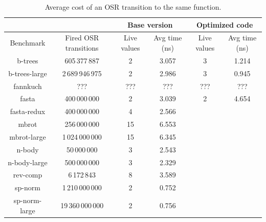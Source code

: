 \begin{table} 
\begin{footnotesize}
    \begin{tabular}{ |c|c|c|c|c|c| }
        \cline{3-6}
        \multicolumn{2}{c|}{} & \multicolumn{2}{c|}{Base version} & \multicolumn{2}{c|}{Optimized code} \\
        \hline
        Benchmark & Fired OSR transitions & Live values & Avg time (ns) & Live values & Avg time (ns) \\ 
        \hline
        \hline
        b-trees & 605\,377\,887 & 2 & 3.057 & 3 & 1.214 \\ 
        \hline
        b-trees-large & 2\,689\,946\,975 & 2 & 2.986 & 3 & 0.945 \\ 
        \hline
        fannkuch & ??? & ??? & ??? & ??? & ??? \\ 
        \hline
        fasta & 400\,000\,000 & 2 & 3.039 & 2 & 4.654 \\ 
        \hline
        fasta-redux & 400\,000\,000 & 4 & 2.566 & & \\ 
        \hline
        mbrot & 256\,000\,000 & 15 & 6.553 & & \\ 
        \hline
        mbrot-large & 1\,024\,000\,000 & 15 & 6.345 & & \\ 
        \hline
        n-body & 50\,000\,000 & 3 & 2.543 & & \\ 
        \hline
        n-body-large & 500\,000\,000 & 3 & 2.329 & & \\ 
        \hline
        rev-comp & 6\,172\,843 & 8 & 3.589 & & \\ 
        \hline
        sp-norm & 1\,210\,000\,000 & 2 & 0.752 & & \\ 
        \hline
        sp-norm-large & 19\,360\,000\,000 & 2 & 0.756 & & \\
        \hline
    \end{tabular} 
\end{footnotesize}
\caption{\label{tab:sameFun}Average cost of an OSR transition to the same function.} 
\end{table}

